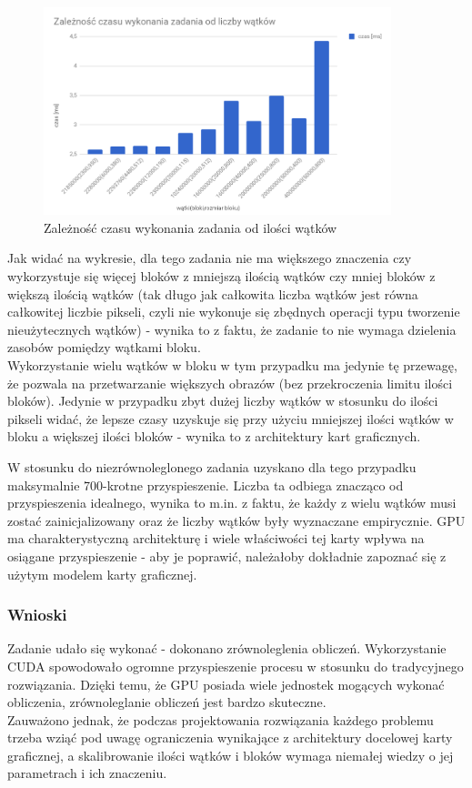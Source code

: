 \documentclass[a4paper,12pt]{article}
\begin{document}
\begin{figure}[!hbtp]
 \centering
  \includegraphics[width=0.9\textwidth]{wykres.png}
  \caption{Zależność czasu wykonania zadania od ilości wątków}
\end{figure}
Jak widać na wykresie, dla tego zadania nie ma większego znaczenia czy wykorzystuje się więcej bloków z mniejszą ilością wątków czy mniej bloków z większą ilością wątków (tak długo jak całkowita liczba wątków jest równa całkowitej liczbie pikseli, czyli nie wykonuje się zbędnych operacji typu tworzenie nieużytecznych wątków) - wynika to z faktu, że zadanie to nie wymaga dzielenia zasobów pomiędzy wątkami bloku. \\
Wykorzystanie wielu wątków w bloku  w tym przypadku ma jedynie tę przewagę, że pozwala na przetwarzanie większych obrazów (bez przekroczenia limitu ilości bloków). Jedynie w przypadku zbyt dużej liczby wątków w stosunku do ilości pikseli widać, że lepsze czasy uzyskuje się przy użyciu mniejszej ilości wątków w bloku a większej ilości bloków - wynika to z architektury kart graficznych.

W stosunku do niezrównoleglonego zadania uzyskano dla tego przypadku maksymalnie 700-krotne przyspieszenie. Liczba ta odbiega znacząco od przyspieszenia idealnego, wynika to m.in. z faktu, że każdy z wielu wątków musi zostać zainicjalizowany oraz  że liczby wątków były wyznaczane empirycznie. GPU ma charakterystyczną architekturę i wiele właściwości tej karty wpływa na osiągane przyspieszenie - aby je poprawić, należałoby dokładnie zapoznać się z użytym modelem karty graficznej.

\subsubsection*{Wnioski }
Zadanie udało się wykonać - dokonano zrównoleglenia obliczeń. Wykorzystanie CUDA spowodowało ogromne przyspieszenie procesu w stosunku do tradycyjnego rozwiązania. Dzięki temu, że GPU posiada wiele jednostek mogących wykonać obliczenia, zrównoleglanie obliczeń jest bardzo skuteczne. \\

 Zauważono jednak, że podczas projektowania rozwiązania każdego problemu trzeba wziąć pod uwagę ograniczenia wynikające z architektury docelowej karty graficznej, a skalibrowanie ilości wątków i bloków wymaga niemałej wiedzy o jej parametrach i ich znaczeniu.
\end{document}
